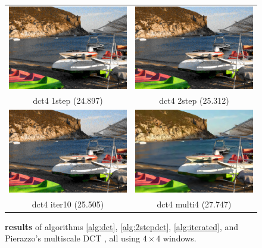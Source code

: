 \documentclass{ipol}
\begin{document}


\begin{figure}[htbp]
\begin{center}
\begin{tabular}{cc}

\includegraphics[width = .44\textwidth]{f/dct4_1step} &
\includegraphics[width = .44\textwidth]{f/dct4_2step} \\
dct4 1step (24.897) & dct4 2step (25.312) \\
\includegraphics[width = .44\textwidth]{f/dct4_iter10} &
\includegraphics[width = .44\textwidth]{f/dct4_multi4} \\
dct4 iter10 (25.505) &  dct4 multi4 (27.747)\\


\end{tabular}
\caption{{\bf results} of algorithms \ref{alg:dct}, \ref{alg:2stepdct},  \ref{alg:iterated}, and Pierazzo's multiscale DCT \cite{multiscaler2016},  all using  $4 \times 4$ windows.}
\label{fig:res4}
\end{center}
\end{figure}
\end{document}
